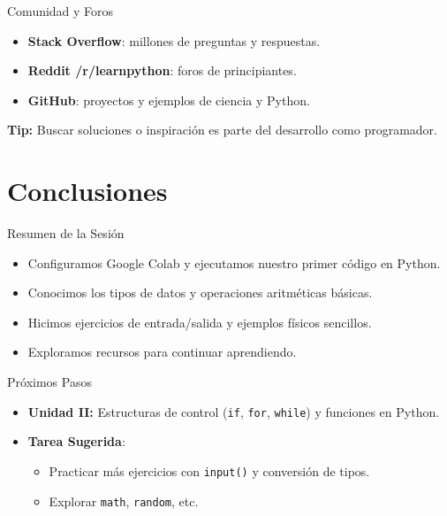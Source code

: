 \documentclass[10pt]{beamer}
\begin{document}
\begin{frame}{Comunidad y Foros}
  \begin{itemize}
    \item \textbf{Stack Overflow}: millones de preguntas y respuestas.
    \item \textbf{Reddit /r/learnpython}: foros de principiantes.
    \item \textbf{GitHub}: proyectos y ejemplos de ciencia y Python.
  \end{itemize}
  \textbf{Tip:} Buscar soluciones o inspiración es parte del desarrollo como programador.
\end{frame}

\section{Conclusiones}

\begin{frame}{Resumen de la Sesión}
  \begin{itemize}
    \item Configuramos Google Colab y ejecutamos nuestro primer código en Python.
    \item Conocimos los tipos de datos y operaciones aritméticas básicas.
    \item Hicimos ejercicios de entrada/salida y ejemplos físicos sencillos.
    \item Exploramos recursos para continuar aprendiendo.
  \end{itemize}
\end{frame}

\begin{frame}{Próximos Pasos}
  \begin{itemize}
    \item \textbf{Unidad II:} Estructuras de control (\texttt{if}, \texttt{for}, \texttt{while}) y funciones en Python.
    \item \textbf{Tarea Sugerida}: 
      \begin{itemize}
        \item Practicar más ejercicios con \texttt{input()} y conversión de tipos.
        \item Explorar \texttt{math}, \texttt{random}, etc.
      \end{itemize}
  \end{itemize}
\end{frame}
\end{document}
